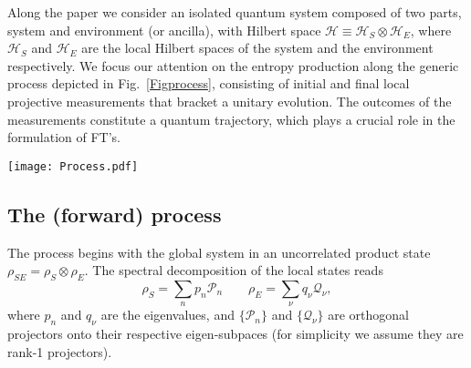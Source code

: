 \documentclass[aps,prx,twocolumn,showpacs,floatfix,superscriptaddress,graphics,longbibliography]{revtex4-1}
\newcommand{\E}{{\mathcal E}}
\newcommand{\HAT}{}
\begin{document}
Along the paper we consider an isolated quantum system composed of two parts, system and environment (or ancilla), with Hilbert space $\mathcal{H} \equiv \mathcal{H}_{S} \otimes \mathcal{H}_E$, 
where $\mathcal{H}_{S}$ and $\mathcal{H}_{E}$ are the local Hilbert spaces of the system and the environment respectively. We focus our attention on the entropy production along the generic process depicted 
in Fig.~\ref{Figprocess}, consisting of initial and final local projective measurements that bracket a unitary evolution. The outcomes of the measurements constitute a quantum trajectory, which plays 
a crucial role in the formulation of FT's.

\begin{figure*}[t]\label{Figprocess}
\begin{center}
\texttt{[image: Process.pdf]}
\caption{Schematic picture of the forward process presented in the main text. 
System and environment start from an uncorrelated state $\rho_S \otimes \rho_E$. A local measurement of observables with projectors $\{\HAT{\mathcal{P}}_n, \HAT{\mathcal{Q}}_\nu \}$ is carried out, which does not alter the density matrix in the average evolution but selects a pure state $\ket{\psi_n}\otimes \ket{\phi_\nu}$ at the trajectory level. 
System and environment then  interact with each other according to the unitary evolution $\HAT{U}_\Lambda$, ending in an entangled state $\rho'_{SE}$. Finally, we measure again now using projectors $\{\HAT{\mathcal{P}}_m^\ast, \HAT{\mathcal{Q}}_\mu^\ast. \}$. 
In the last measurement quantum correlations in state $\rho_{SE}'$ are erased, while the final state $\rho_{SE}^\ast$ may still have in general non-zero classical correlations. 
The reduced evolution of the system conditioned to the measurement in the environment is described through the quantum operation $\E_{\mu \nu}$ (shaded area). } 
\end{center}
\end{figure*}


\subsection{The (forward) process}

The process begins with the global system in  an uncorrelated product state $\rho_{SE} = \rho_S \otimes \rho_E$. The spectral decomposition of the local states reads
\begin{equation}\label{i_state}
\rho_S = \sum_n p_n \HAT{\mathcal{P}}_n \qquad \rho_E = \sum_\nu q_\nu \HAT{\mathcal{Q}}_\nu,
\end{equation}
where $p_n$ and $q_\nu$ are the eigenvalues, and $\{\HAT{\mathcal{P}}_n\}$ and $\{\HAT{\mathcal{Q}}_\nu\}$ are orthogonal projectors onto their respective eigen-subpaces (for simplicity we assume they are rank-1 projectors).
\end{document}
